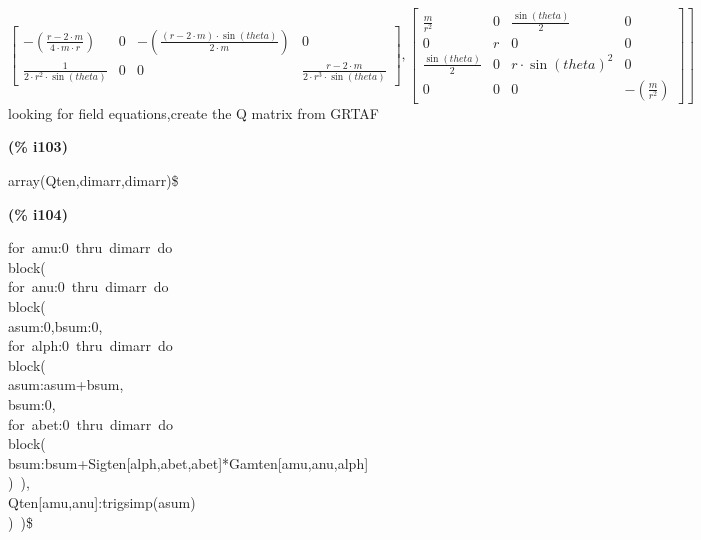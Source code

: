 \documentclass[fleqn]{article}
\begin{document}
\[\begin{bmatrix}
\mathop{-}\left( \frac{r\mathop{-}2\mathop{\ensuremath{\cdot}}m}{4\mathop{\ensuremath{\cdot}}m\mathop{\ensuremath{\cdot}}r}\right)  & 0 & \mathop{-}\left( \frac{\left( r\mathop{-}2\mathop{\ensuremath{\cdot}}m\right) \mathop{\ensuremath{\cdot}}\sin{(theta)}}{2\mathop{\ensuremath{\cdot}}m}\right)  & 0\\
\frac{1}{2\mathop{\ensuremath{\cdot}}{{r}^{2}}\mathop{\ensuremath{\cdot}}\sin{(theta)}} & 0 & 0 & \frac{r\mathop{-}2\mathop{\ensuremath{\cdot}}m}{2\mathop{\ensuremath{\cdot}}{{r}^{3}}\mathop{\ensuremath{\cdot}}\sin{(theta)}}\end{bmatrix}\mathop{,}\begin{bmatrix}\frac{m}{{{r}^{2}}} & 0 & \frac{\sin{(theta)}}{2} & 0\\
0 & r & 0 & 0\\
\frac{\sin{(theta)}}{2} & 0 & r\mathop{\ensuremath{\cdot}}{{\sin{(theta)}}^{2}} & 0\\
0 & 0 & 0 & \mathop{-}\left( \frac{m}{{{r}^{2}}}\right) \end{bmatrix}\mathop{]}\mbox{}
\]
looking for field equations,create the Q matrix from GRTAF


\noindent
\begin{minipage}[t]{4.000000em}\color{red}\bfseries
(\% i103)	
\end{minipage}
\begin{minipage}[t]{\textwidth}\color{blue}
array(Qten,dimarr,dimarr)\$
\end{minipage}

\noindent%



\noindent
\begin{minipage}[t]{4.000000em}\color{red}\bfseries
(\% i104)	
\end{minipage}
\begin{minipage}[t]{\textwidth}\color{blue}
for\ amu:0\ thru\ dimarr\ do\\
block(\\
for\ anu:0\ thru\ dimarr\ do\\
block(\\
asum:0,bsum:0,\\
for\ alph:0\ thru\ dimarr\ do\\
block(\\
asum:asum+bsum,\\
bsum:0,\\
for\ abet:0\ thru\ dimarr\ do\\
block(\\
bsum:bsum+Sigten[alph,abet,abet]*Gamten[amu,anu,alph]\ \ \\
)\ ),\\
Qten[amu,anu]:trigsimp(asum)\ \\
)\ )\$
\end{minipage}
\end{document}
